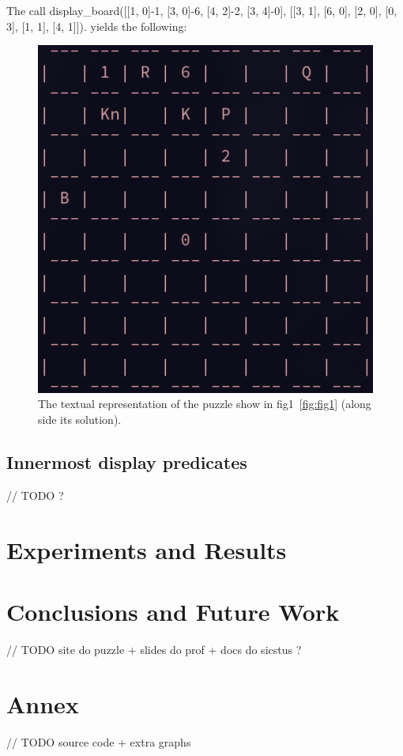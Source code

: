 \documentclass[runningheads]{llncs}
\begin{document}
The call display\_board([[1, 0]-1, [3, 0]-6, [4, 2]-2, [3, 4]-0],
[[3, 1], [6, 0], [2, 0], [0, 3], [1, 1], [4, 1]]). yields the following:
\begin{figure}[H]
\includegraphics[width=0.5\linewidth]{figures/display_board_2.png}
  \centering
  \caption{The textual representation of the puzzle show in fig1~\ref{fig:fig1}
  (along side its solution).}\label{fig3}
\end{figure}

\subsection{Innermost display predicates}

// TODO ?

\section{Experiments and Results}

\section{Conclusions and Future Work}

// TODO site do puzzle + slides do prof + docs do sicstus ?
\begin{thebibliography}{8}




\end{thebibliography}

\section{Annex}

// TODO source code + extra graphs
\end{document}
